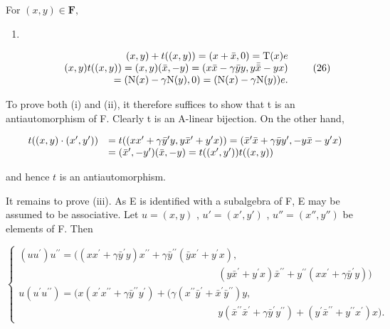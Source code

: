For \((x,y)\in \mathbf{F},\)

\begin{enumerate}
\def\labelenumi{(\arabic{enumi})}
\setcounter{enumi}{24}
\tightlist
\item
\end{enumerate}

\[
\begin{array}{r l r} & & {(x, y) + t ((x, y)) = (x + \bar {x}, 0) = \mathrm{T} (x) e} \\ & & {(x, y) t ((x, y)) = (x, y) (\bar {x}, - y) = (x \bar {x} - \gamma \bar {y} y, y \bar {\bar {x}} - y x)} \\ & & {= (\mathrm{N} (x) - \gamma \mathrm{N} (y), 0) = (\mathrm{N} (x) - \gamma \mathrm{N} (y)) e.} \end{array}\tag{26}
\]

To prove both (i) and (ii), it therefore suffices to show that t is an antiautomorphism of F. Clearly t is an A-linear bijection. On the other hand,

\[
\begin{array}{r l} t ((x, y) \cdot (x ^ {\prime}, y ^ {\prime})) & = t ((x x ^ {\prime} + \gamma \bar {y} ^ {\prime} y, y \bar {x} ^ {\prime} + y ^ {\prime} x)) = (\bar {x} ^ {\prime} \bar {x} + \gamma \bar {y} y ^ {\prime}, - y \bar {x} - y ^ {\prime} x) \\ & = (\bar {x} ^ {\prime}, - y ^ {\prime}) (\bar {x}, - y) = t ((x ^ {\prime}, y ^ {\prime})) t ((x, y)) \end{array}
\]

and hence \(t\) is an antiautomorphism.

It remains to prove (iii). As E is identified with a subalgebra of F, E may be assumed to be associative. Let \(u = (x, y)\) , \(u' = (x', y')\) , \(u'' = (x'', y'')\) be elements of F. Then

\[
\left\{ \begin{array}{l} (u u ^ {\prime}) u ^ {\prime \prime} = ((x x ^ {\prime} + \gamma \bar {y} ^ {\prime} y) x ^ {\prime \prime} + \gamma \bar {y} ^ {\prime \prime} (\bar {y} x ^ {\prime} + y ^ {\prime} x), \\ \qquad \qquad \qquad \qquad \qquad \qquad \qquad \qquad \qquad \qquad (y \bar {x} ^ {\prime} + y ^ {\prime} x) \bar {x} ^ {\prime \prime} + y ^ {\prime \prime} (x x ^ {\prime} + \gamma \bar {y} ^ {\prime} y)) \\ u (u ^ {\prime} u ^ {\prime \prime}) = (x (x ^ {\prime} x ^ {\prime \prime} + \gamma \bar {y} ^ {\prime \prime} y ^ {\prime}) + (\gamma (x ^ {\prime \prime} \bar {y} ^ {\prime} + \bar {x} ^ {\prime} \bar {y} ^ {\prime \prime}) y, \\ \qquad \qquad \qquad \qquad \qquad \qquad \qquad \qquad \qquad \qquad y (\bar {x} ^ {\prime \prime} \bar {x} ^ {\prime} + \gamma \bar {y} ^ {\prime} y ^ {\prime \prime}) + (y ^ {\prime} \bar {x} ^ {\prime \prime} + y ^ {\prime \prime} x ^ {\prime}) x). \end{array} \right.\tag{27}
\]

